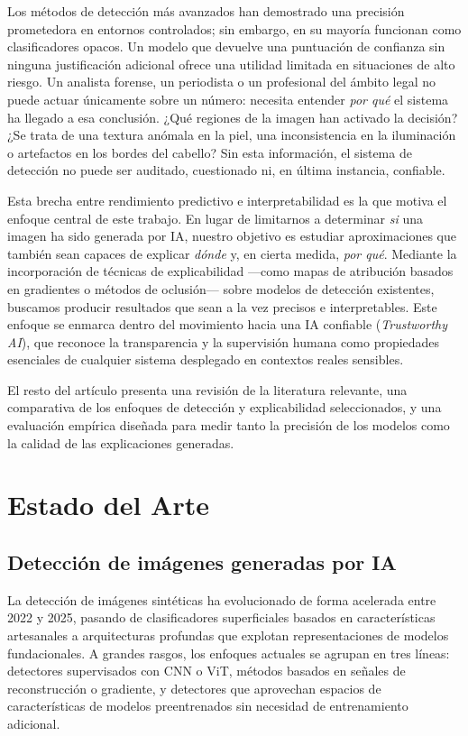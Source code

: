 \documentclass[12pt,a4paper,twoside]{article}
\begin{document}
Los métodos de detección más avanzados han demostrado una precisión prometedora en entornos
controlados; sin embargo, en su mayoría funcionan como clasificadores opacos. Un modelo que
devuelve una puntuación de confianza sin ninguna justificación adicional ofrece una utilidad limitada en situaciones de alto riesgo. Un
analista forense, un periodista o un profesional del ámbito legal no puede actuar únicamente sobre
un número: necesita entender \textit{por qué} el sistema ha llegado a esa conclusión. ¿Qué regiones
de la imagen han activado la decisión? ¿Se trata de una textura anómala en la piel, una
inconsistencia en la iluminación o artefactos en los bordes del cabello? Sin esta información, el
sistema de detección no puede ser auditado, cuestionado ni, en última instancia, confiable.

Esta brecha entre rendimiento predictivo e interpretabilidad es la que motiva el enfoque central
de este trabajo. En lugar de limitarnos a determinar \textit{si} una imagen ha sido generada por
IA, nuestro objetivo es estudiar aproximaciones que también sean capaces de explicar \textit{dónde}
y, en cierta medida, \textit{por qué}. Mediante la incorporación de técnicas de explicabilidad
---como mapas de atribución basados en gradientes o métodos de oclusión--- sobre modelos de
detección existentes, buscamos producir resultados que sean a la vez precisos e interpretables.
Este enfoque se enmarca dentro del movimiento hacia una IA confiable (\textit{Trustworthy AI}),
que reconoce la transparencia y la supervisión humana como propiedades esenciales de cualquier
sistema desplegado en contextos reales sensibles.

El resto del artículo presenta una revisión de la literatura relevante, una comparativa de los
enfoques de detección y explicabilidad seleccionados, y una evaluación empírica diseñada para
medir tanto la precisión de los modelos como la calidad de las explicaciones generadas.


\section{Estado del Arte}

\subsection{Detección de imágenes generadas por IA}

La detección de imágenes sintéticas ha evolucionado de forma acelerada entre 2022 y
2025, pasando de clasificadores superficiales basados en características artesanales
a arquitecturas profundas que explotan representaciones de modelos fundacionales. A
grandes rasgos, los enfoques actuales se agrupan en tres líneas: detectores
supervisados con CNN o ViT, métodos basados en señales de reconstrucción o
gradiente, y detectores que aprovechan espacios de características de modelos
preentrenados sin necesidad de entrenamiento adicional.
\end{document}
